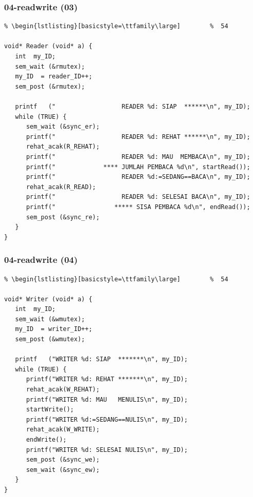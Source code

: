 \documentclass[xcolor=table, notheorems, hyperref={pdfpagelabels=false}]{beamer}
\begin{document}
\begin{frame}[fragile]
\frametitle{04-readwrite (03)}
\begin{lstlisting}[basicstyle=\ttfamily\footnotesize] %  72
% \begin{lstlisting}[basicstyle=\ttfamily\small]        %  65
% \begin{lstlisting}[basicstyle=\ttfamily\large]        %  54

void* Reader (void* a) {
   int  my_ID;
   sem_wait (&rmutex);
   my_ID  = reader_ID++;
   sem_post (&rmutex);

   printf   ("                  READER %d: SIAP  ******\n", my_ID);
   while (TRUE) {
      sem_wait (&sync_er);
      printf("                  READER %d: REHAT ******\n", my_ID);
      rehat_acak(R_REHAT);
      printf("                  READER %d: MAU  MEMBACA\n", my_ID);
      printf("             **** JUMLAH PEMBACA %d\n", startRead());
      printf("                  READER %d:=SEDANG==BACA\n", my_ID);
      rehat_acak(R_READ);
      printf("                  READER %d: SELESAI BACA\n", my_ID);
      printf("                ***** SISA PEMBACA %d\n", endRead());
      sem_post (&sync_re);
   }
}

\end{lstlisting}
\end{frame}

\begin{frame}[fragile]
\frametitle{04-readwrite (04)}
\begin{lstlisting}[basicstyle=\ttfamily\footnotesize] %  72
% \begin{lstlisting}[basicstyle=\ttfamily\small]        %  65
% \begin{lstlisting}[basicstyle=\ttfamily\large]        %  54

void* Writer (void* a) {
   int  my_ID;
   sem_wait (&wmutex);
   my_ID  = writer_ID++;
   sem_post (&wmutex);

   printf   ("WRITER %d: SIAP  *******\n", my_ID);
   while (TRUE) {
      printf("WRITER %d: REHAT *******\n", my_ID);
      rehat_acak(W_REHAT);
      printf("WRITER %d: MAU   MENULIS\n", my_ID);
      startWrite();
      printf("WRITER %d:=SEDANG==NULIS\n", my_ID);
      rehat_acak(W_WRITE);
      endWrite();
      printf("WRITER %d: SELESAI NULIS\n", my_ID);
      sem_post (&sync_we);
      sem_wait (&sync_ew);
   }
}

\end{lstlisting}
\end{frame}
\end{document}
